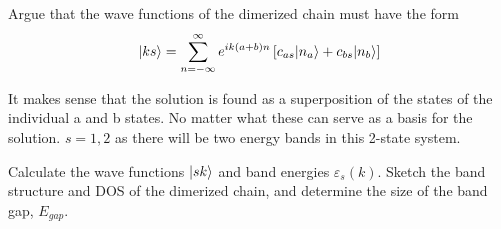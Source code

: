 \begin{exercise}
Argue that the wave functions of the dimerized chain must have the form
\begin{equation}
    |ks\rangle = \sum_{n=-\infty}^{\infty} e^{ik(a+b)n} \left[ c_{as} |n_a\rangle + c_{bs} |n_b\rangle \right]
\end{equation}
\end{exercise}

\begin{solution}
It makes sense that the solution is found as a superposition of the states of the individual a and b states. No matter what these can serve as a basis for the solution.
$s=1,2$ as there will be two energy bands in this 2-state system.
\end{solution}

\begin{exercise}
Calculate the wave functions $|sk\rangle$ and band energies $\varepsilon_s(k)$. Sketch the
band structure and DOS of the dimerized chain, and determine the size of
the band gap, $E_{gap}$.
\end{exercise}

